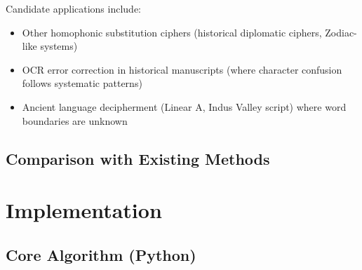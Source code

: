 \documentclass[11pt,a4paper]{article}
\begin{document}
Candidate applications include:
\begin{itemize}
\item Other homophonic substitution ciphers (historical diplomatic ciphers, Zodiac-like systems)
\item OCR error correction in historical manuscripts (where character confusion follows systematic patterns)
\item Ancient language decipherment (Linear A, Indus Valley script) where word boundaries are unknown
\end{itemize}

\subsection{Comparison with Existing Methods}

\begin{table}[h]
\centering
{}
\end{table}

\section{Implementation}

\subsection{Core Algorithm (Python)}
\end{document}
